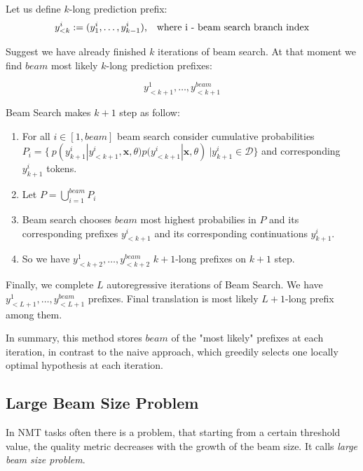 \documentclass[a4paper,14pt]{extarticle}
\begin{document}
	Let us define $k$-long prediction prefix:
	\begin{equation}
		y_{<k}^{i} := (y_1^{i}, \dots, y_{k-1}^{i}) \text{, \,\, where i - beam search branch index}
	\end{equation}
	
	Suggest we have already finished $k$ iterations of beam search. At that moment we find $beam$ most likely $k$-long prediction prefixes:
	
	\begin{equation*}
		y_{<k+1}^1, \dots, y_{<k+1}^{beam}
	\end{equation*}
	
	Beam Search makes $k+1$ step as follow:
	
	\begin{enumerate}
		\item For all $i \in [1, beam]$ beam search consider cumulative probabilities \\ $P_i = \{ ~p(y_{k+1}^i | y_{<k+1}^i, \textbf{x}, \theta)p(y_{<k+1}^i | \textbf{x}, \theta) ~ | y_{k+1}^i \in \mathcal{D}\}$ and corresponding $y_{k+1}^i$ tokens.
		
		\item Let $P = \bigcup_{i=1}^{beam} P_i$
		
		\item Beam search chooses $beam$ most highest probabilies in $P$ and its corresponding prefixes $y_{<k+1}^{i}$ and its corresponding continuations $y_{k+1}^i$.
		
		\item So we have $y_{<k+2}^1, \dots, y_{<k+2}^{beam}$ $k+1$-long prefixes on $k+1$ step.
	\end{enumerate}
	
	Finally, we complete $L$ autoregressive iterations of Beam Search. We have $y_{<L+1}^1, \dots, y_{<L+1}^{beam}$ prefixes. Final translation is most likely $L+1$-long prefix among them.
	
	In summary, this method stores $beam$ of the "most likely" prefixes at each iteration, in contrast to the naive approach, which greedily selects one locally optimal hypothesis at each iteration.
	
	\subsection{Large Beam Size Problem}
	In NMT tasks often there is a problem, that starting from a certain threshold value, the quality metric decreases with the growth of the beam size. It calls \textit{large beam size problem}.
	
\end{document}
